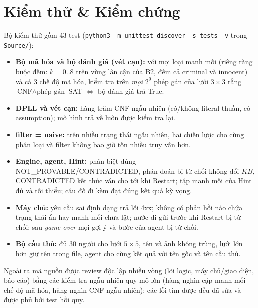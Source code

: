 \documentclass{article}
\newcommand{\code}[1]{\texttt{#1}}
\newcommand{\KB}{\mathit{KB}}
\begin{document}
\section{Kiểm thử \& Kiểm chứng}\label{sec:test}
Bộ kiểm thử gồm 43 test (\code{python3 -m unittest discover -s tests -v} trong \code{Source/}):
\begin{itemize}[noitemsep]
    \item \textbf{Bộ mã hóa và bộ đánh giá (vét cạn):} với mọi loại manh mối (riêng ràng buộc đếm: $k = 0..8$ trên vùng lân cận của B2, đếm cả criminal và innocent) và cả 3 chế độ mã hóa, kiểm tra trên \textit{mọi} $2^9$ phép gán của lưới $3\times3$ rằng $\text{CNF} \land \text{phép gán}$ SAT $\iff$ bộ đánh giá trả True.
    \item \textbf{DPLL và vét cạn:} hàng trăm CNF ngẫu nhiên (có/không literal thuần, có assumption); mô hình trả về luôn được kiểm tra lại.
    \item \textbf{filter = naive:} trên nhiều trạng thái ngẫu nhiên, hai chiến lược cho cùng phân loại và filter không bao giờ tốn nhiều truy vấn hơn.
    \item \textbf{Engine, agent, Hint:} phân biệt đúng NOT\_PROVABLE/CONTRADICTED, phán đoán bị từ chối không đổi $\KB$, CONTRADICTED kết thúc ván cho tới khi Restart; tập manh mối của Hint đủ và tối thiểu; câu đố đi kèm đạt đúng kết quả kỳ vọng.
    \item \textbf{Máy chủ:} yêu cầu sai định dạng trả lỗi 4xx; không có phản hồi nào chứa trạng thái ẩn hay manh mối chưa lật; nước đi gửi trước khi Restart bị từ chối; sau \textit{game over} mọi gợi ý và bước của agent bị từ chối.
    \item \textbf{Bộ cầu thủ:} đủ 30 người cho lưới $5\times5$, tên và ảnh không trùng, lưới lớn hơn giữ tên trong file, agent cho cùng kết quả với tên gốc và tên cầu thủ.
\end{itemize}
Ngoài ra mã nguồn được review độc lập nhiều vòng (lõi logic, máy chủ/giao diện, báo cáo) bằng các kiểm tra ngẫu nhiên quy mô lớn (hàng nghìn cặp manh mối--chế độ mã hóa, hàng nghìn CNF ngẫu nhiên); các lỗi tìm được đều đã sửa và được phủ bởi test hồi quy.

\end{document}
